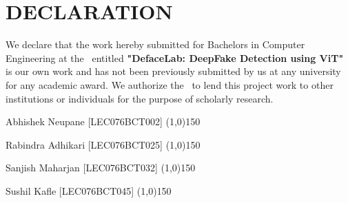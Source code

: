 \section*{DECLARATION}

We declare that the work hereby submitted for Bachelors in Computer Engineering at the \thecampus \ entitled \textbf{"DefaceLab:  DeepFake Detection using ViT"} is our own work and has not been previously submitted by us at any university for any academic award.
We authorize the \thecampus \ to lend this project work
to other institutions or individuals for the purpose of scholarly research.

\vspace{1cm}
\noindent Abhishek Neupane [LEC076BCT002] \space{}\space{}\space{}\space{}\space{}\space{}  \line(1,0){150}\\
\vspace{0.2cm}

\noindent Rabindra Adhikari [LEC076BCT025] \space{}\space{}\space{}\space{}\space{}\space{}\space{} \line(1,0){150} \\
\vspace{0.2cm}

\noindent Sanjish Maharjan [LEC076BCT032]\space{}\space{}\space{}\space{}\space{}\space{}\space{}\space{}\space{} \line(1,0){150} \\
\vspace{0.2cm}

\noindent Sushil Kafle [LEC076BCT045]\space{}\space{}\space{}\space{}\space{}\space{}\space{}\space{} \space{}\space{}\space{}\space{}\space{}\space{}\space{}\space{}\space{}\line(1,0){150}\\


\vspace{0.7cm}
\noindent \thedate \\
